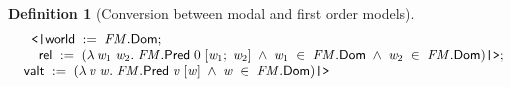 \documentclass[letterpaper]{article}
\newtheorem{defn}{Definition}
\newenvironment{holmath}{\begin{displaymath}\begin{array}{l}}{\end{array}\end{displaymath}\ignorespacesafterend}
\begin{document}
\begin{defn}[Conversion between modal and first order models]
\begin{holmath}
\;\;\;\;\HOLTokenLeftrec{}\HOLFieldName{world}\;:=\;\HOLFreeVar{FM}.\HOLFieldName{Dom};\\
\;\;\;\;\;\;\HOLFieldName{rel}\;:=\;(\HOLTokenLambda{}\HOLBoundVar{w\sb{\mathrm{1}}}\;\HOLBoundVar{w\sb{\mathrm{2}}}.\;\HOLFreeVar{FM}.\HOLFieldName{Pred}\;\HOLNumLit{0}\;[\HOLBoundVar{w\sb{\mathrm{1}}};\;\HOLBoundVar{w\sb{\mathrm{2}}}]\;\HOLSymConst{\HOLTokenConj{}}\;\HOLBoundVar{w\sb{\mathrm{1}}}\;\HOLSymConst{\HOLTokenIn{}}\;\HOLFreeVar{FM}.\HOLFieldName{Dom}\;\HOLSymConst{\HOLTokenConj{}}\;\HOLBoundVar{w\sb{\mathrm{2}}}\;\HOLSymConst{\HOLTokenIn{}}\;\HOLFreeVar{FM}.\HOLFieldName{Dom})\HOLTokenRightrec{};\\
\;\;\HOLFieldName{valt}\;:=\;(\HOLTokenLambda{}\HOLBoundVar{v}\;\HOLBoundVar{w}.\;\HOLFreeVar{FM}.\HOLFieldName{Pred}\;\HOLBoundVar{v}\;[\HOLBoundVar{w}]\;\HOLSymConst{\HOLTokenConj{}}\;\HOLBoundVar{w}\;\HOLSymConst{\HOLTokenIn{}}\;\HOLFreeVar{FM}.\HOLFieldName{Dom})\HOLTokenRightrec{}
\end{holmath}
\end{defn}
\end{document}
